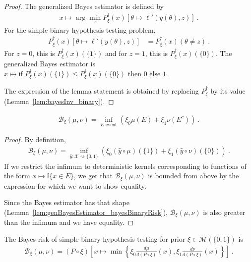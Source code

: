 \begin{proof}%
{}
The generalized Bayes estimator is defined by
\begin{align*}
x \mapsto \arg\min_z P_\xi^\dagger(x)\left[\theta \mapsto \ell'(y(\theta), z)\right] \: .
\end{align*}
For the simple binary hypothesis testing problem,
\begin{align*}
P_\xi^\dagger(x)\left[\theta \mapsto \ell'(y(\theta), z)\right]
&= P_\xi^\dagger(x)(\theta \ne z)
\: .
\end{align*}
For $z = 0$, this is $P_\xi^\dagger(x)(\{1\})$ and for $z = 1$, this is $P_\xi^\dagger(x)(\{0\})$.
The generalized Bayes estimator is $x \mapsto \text{if } P_\xi^\dagger(x)(\{1\}) \le P_\xi^\dagger(x)(\{0\}) \text{ then } 0 \text{ else } 1$.

The expression of the lemma statement is obtained by replacing $P_\xi^\dagger$ by its value (Lemma~\ref{lem:bayesInv_binary}).
\end{proof}


\begin{lemma}
  \label{lem:bayesBinaryRisk_eq_event}
  \begin{align*}
  \mathcal B_\xi(\mu, \nu) = \inf_{E \text{ event}} \left( \xi_0 \mu(E) + \xi_1 \nu(E^c) \right) \: .
  \end{align*}
\end{lemma}

\begin{proof}%
{}
By definition,
\begin{align*}
\mathcal B_\xi(\mu, \nu)
= \inf_{\hat{y} : \mathcal X \rightsquigarrow \{0,1\}}\left(\xi_0 (\hat{y} \circ \mu)(\{1\}) + \xi_1 (\hat{y} \circ \nu)(\{0\})\right)
\: .
\end{align*}
If we restrict the infimum to deterministic kernels corresponding to functions of the form $x \mapsto \mathbb{I}\{x \in E\}$, we get that $\mathcal B_\xi(\mu, \nu)$ is bounded from above by the expression for which we want to show equality.

Since the Bayes estimator has that shape (Lemma~\ref{lem:genBayesEstimator_bayesBinaryRisk}), $\mathcal B_\xi(\mu, \nu)$ is also greater than the infimum and we have equality.
\end{proof}


\begin{theorem}
  \label{thm:bayesBinaryRisk_eq}
  The Bayes risk of simple binary hypothesis testing for prior $\xi \in \mathcal M(\{0,1\})$ is
  \begin{align*}
  \mathcal B_\xi(\mu, \nu) = (P \circ \xi)\left[x \mapsto \min \left\{\xi_0\frac{d \mu}{d(P \circ \xi)}(x), \xi_1\frac{d \nu}{d(P \circ \xi)}(x)\right\}\right]
  \: .
  \end{align*}
\end{theorem}

